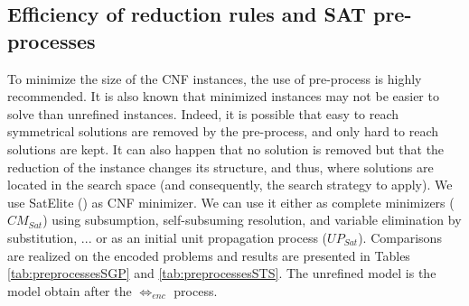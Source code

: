 \documentclass[3p,authoryear,times]{elsarticle}
\newcommand{\enc}[0]{\Leftrightarrow_{enc}}
\begin{document}
\subsection{Efficiency of reduction rules and SAT pre-processes}
\label{sec:efficiency}
To minimize the size of the CNF instances, the use of pre-process is highly recommended. It is also known that minimized instances may not be easier to solve than unrefined instances. Indeed, it is possible that easy to reach symmetrical solutions are removed by the pre-process, and only hard to reach solutions are kept. It can also happen that no solution is removed but that the reduction of the instance changes its structure, and thus, where solutions are located in the search space (and consequently, the search strategy to apply). We use SatElite (\cite{satelite05}) as CNF minimizer. We can use it either as complete minimizers  ($CM_{Sat}$) using subsumption, self-subsuming resolution, and variable elimination by substitution, ... or  as an initial unit propagation process ($UP_{Sat}$). Comparisons are realized on the 
encoded  problems and results are presented in Tables \ref{tab:preprocessesSGP} and \ref{tab:preprocessesSTS}. The unrefined model is the model obtain after the $\enc$ process. 
\end{document}
